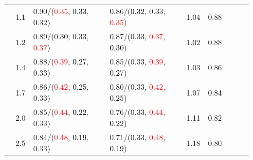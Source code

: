 \documentclass[10pt,a4paper]{report}
\begin{document}
\begin{table}[!htbp]
\begin{center}
{\begin{tabular}{ccllccccc}
				  & 1.1                               & 0.90/(\textcolor{red}{0.35}, 0.33, \textcolor{black}{0.32})                                                                                                                                   & 0.86/(\textcolor{black}{0.32}, 0.33, \textcolor{red}{0.35})                                                                                                                                   & 1.04             & 0.88                     \\
				  & 1.2                               & 0.89/(\textcolor{black}{0.30}, 0.33, \textcolor{red}{0.37})                                                                                                                                   & 0.87/(0.33, \textcolor{red}{0.37}, \textcolor{black}{0.30})                                                                                                                                   & 1.02             & 0.88                     \\
				  & 1.4                               & 0.88/(\textcolor{red}{0.39}, \textcolor{black}{0.27}, 0.33)                                                                                                                                   & 0.85/(0.33, \textcolor{red}{0.39}, \textcolor{black}{0.27})                                                                                                                                   & 1.03             & 0.86                     \\
				  & 1.7                               & 0.86/(\textcolor{red}{0.42}, \textcolor{black}{0.25}, 0.33)                                                                                                                                   & 0.80/(0.33, \textcolor{red}{0.42}, \textcolor{black}{0.25})                                                                                                                                   & 1.07             & 0.84                     \\
				  & 2.0                               & 0.85/(\textcolor{red}{0.44}, \textcolor{black}{0.22}, 0.33)                                                                                                                                   & 0.76/(0.33, \textcolor{red}{0.44}, \textcolor{black}{0.22})                                                                                                                                   & 1.11             & 0.82                     \\
				  & 2.5                               & 0.84/(\textcolor{red}{0.48}, \textcolor{black}{0.19}, 0.33)                                                                                                                                   & 0.71/(0.33, \textcolor{red}{0.48}, \textcolor{black}{0.19})                                                                                                                                   & 1.18             & 0.80                     \\

\end{tabular}}
\end{center}
\end{table}
\end{document}
